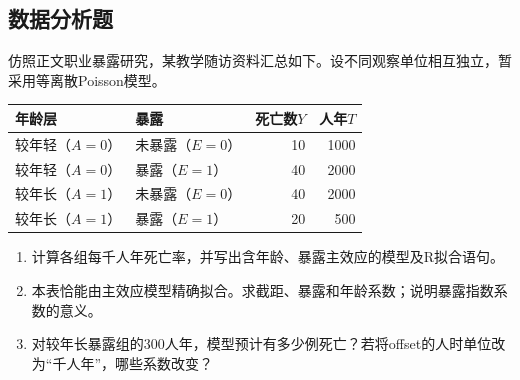 \par\addvspace{8pt}\noindent\begin{minipage}{\linewidth}

\subsection{数据分析题}


仿照正文职业暴露研究，某教学随访资料汇总如下。设不同观察单位相互独立，暂采用等离散Poisson模型。
\begin{center}\begin{tabular}{llrr}\toprule
年龄层 & 暴露 & 死亡数\(Y\) & 人年\(T\)\\\midrule
较年轻（\(A=0\)） & 未暴露（\(E=0\)） & 10 & 1000\\
较年轻（\(A=0\)） & 暴露（\(E=1\)） & 40 & 2000\\
较年长（\(A=1\)） & 未暴露（\(E=0\)） & 40 & 2000\\
较年长（\(A=1\)） & 暴露（\(E=1\)） & 20 & 500\\\bottomrule
\end{tabular}\end{center}
\begin{enumerate}
\item 计算各组每千人年死亡率，并写出含年龄、暴露主效应的模型及R拟合语句。
\item 本表恰能由主效应模型精确拟合。求截距、暴露和年龄系数；说明暴露指数系数的意义。
\item 对较年长暴露组的300人年，模型预计有多少例死亡？若将offset的人时单位改为“千人年”，哪些系数改变？
\end{enumerate}


\end{minipage}\par\vspace{5pt}

